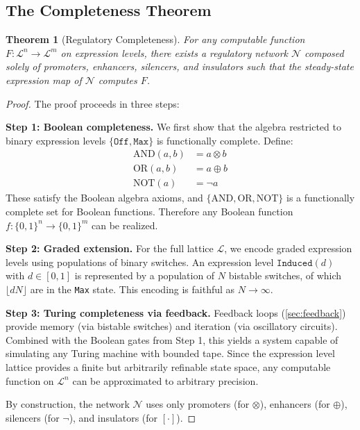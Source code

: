 \documentclass[12pt,a4paper]{article}
\newtheorem{theorem}{Theorem}[section]
\begin{document}
\subsection{The Completeness Theorem}

\begin{theorem}[Regulatory Completeness]\label{thm:completeness}
For any computable function $F : \mathcal{L}^n \to \mathcal{L}^m$ on expression levels, there exists a regulatory network $\mathcal{N}$ composed solely of promoters, enhancers, silencers, and insulators such that the steady-state expression map of $\mathcal{N}$ computes $F$.
\end{theorem}

\begin{proof}
The proof proceeds in three steps:

\textbf{Step 1: Boolean completeness.}
We first show that the algebra restricted to binary expression levels $\{\texttt{Off}, \texttt{Max}\}$ is functionally complete.  Define:
\begin{align}
\text{AND}(a,b) &= a \otimes b \\
\text{OR}(a,b) &= a \oplus b \\
\text{NOT}(a) &= \neg a
\end{align}
These satisfy the Boolean algebra axioms, and $\{\text{AND}, \text{OR}, \text{NOT}\}$ is a functionally complete set for Boolean functions.  Therefore any Boolean function $f : \{0,1\}^n \to \{0,1\}^m$ can be realized.

\textbf{Step 2: Graded extension.}
For the full lattice $\mathcal{L}$, we encode graded expression levels using populations of binary switches.  An expression level $\texttt{Induced}(d)$ with $d \in [0,1]$ is represented by a population of $N$ bistable switches, of which $\lfloor dN \rfloor$ are in the \texttt{Max} state.  This encoding is faithful as $N \to \infty$.

\textbf{Step 3: Turing completeness via feedback.}
Feedback loops (\cref{sec:feedback}) provide memory (via bistable switches) and iteration (via oscillatory circuits).  Combined with the Boolean gates from Step 1, this yields a system capable of simulating any Turing machine with bounded tape.  Since the expression level lattice provides a finite but arbitrarily refinable state space, any computable function on $\mathcal{L}^n$ can be approximated to arbitrary precision.

By construction, the network $\mathcal{N}$ uses only promoters (for $\otimes$), enhancers (for $\oplus$), silencers (for $\neg$), and insulators (for $[\cdot]$).
\end{proof}
\end{document}
